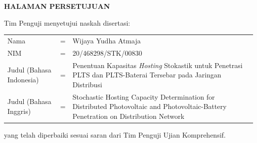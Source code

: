 \BgThispage
\centerline{\fontsize{14}{16}\textbf{HALAMAN PERSETUJUAN}}
\vspace*{27pt}
\noindent Tim Penguji menyetujui naskah disertasi:
\vspace*{-8pt}
{
\begin{longtable}{llp{264pt}}
	\hspace*{-11pt}Nama						& = & Wijaya Yudha Atmaja\\
	\hspace*{-11pt}NIM						& = & 20/468298/STK/00830\\
	\hspace*{-11pt}Judul (Bahasa Indonesia)	& = & Penentuan Kapasitas \textit{Hosting} Stokastik untuk Penetrasi PLTS dan PLTS-Baterai Tersebar pada Jaringan Distribusi\\
	\hspace*{-11pt}Judul	(Bahasa Inggris) 	& = & Stochastic Hosting Capacity Determination for Distributed Photovoltaic and Photovoltaic-Battery Penetration on Distribution Network
\end{longtable}
}
\vspace*{-22pt}
\noindent yang telah diperbaiki sesuai saran dari Tim Penguji Ujian Komprehensif.

